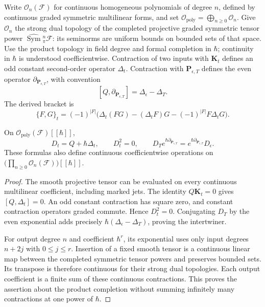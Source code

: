 Write $\mathcal O_n(\mathcal F)$ for continuous homogeneous
polynomials of degree $n$, defined by continuous graded symmetric
multilinear forms, and set
$\mathcal O_{\mathrm{poly}}=\bigoplus_{n\geq0}\mathcal O_n$.
Give $\mathcal O_n$ the strong dual topology of the completed
projective graded symmetric tensor power
$\widehat{\operatorname{Sym}}{}^n_\pi\mathcal F$:
its seminorms are uniform bounds on bounded sets of that space.
Use the product topology in field degree and formal completion
in $\hbar$; continuity in $\hbar$ is understood coefficientwise.
Contraction of two inputs with $\mathbf K_t$ defines an odd
constant second-order operator $\Delta_t$.
Contraction with $\mathbf P_{\epsilon,T}$ defines the even
operator $\partial_{\mathbf P_{\epsilon,T}}$, with convention
\[
 [Q,\partial_{\mathbf P_{\epsilon,T}}]
      =\Delta_\epsilon-\Delta_T.
\]
The derived bracket is
\[
 \{F,G\}_t=(-1)^{|F|}
  \bigl(\Delta_t(FG)-(\Delta_tF)G
                   -(-1)^{|F|}F\Delta_tG\bigr).
\]

\begin{proposition}\label{mht:prop:free-heat-bv}
On $\mathcal O_{\mathrm{poly}}(\mathcal F)[[\hbar]]$,
\begin{equation}\label{mht:eq:free-heat-flow}
 D_t=Q+\hbar\Delta_t,\qquad D_t^2=0,
 \qquad
 D_Te^{\hbar\partial_{\mathbf P_{\epsilon,T}}}
   =e^{\hbar\partial_{\mathbf P_{\epsilon,T}}}D_\epsilon.
\end{equation}
These formulas also define continuous coefficientwise operations
on $\bigl(\prod_{n\geq0}\mathcal O_n(\mathcal F)\bigr)[[\hbar]]$.
\end{proposition}

\begin{proof}
The smooth projective tensor can be evaluated on every
continuous multilinear coefficient, including marked jets.
The identity $Q\mathbf K_t=0$ gives $[Q,\Delta_t]=0$.
An odd constant contraction has square zero, and constant
contraction operators graded commute. Hence $D_t^2=0$.
Conjugating $D_T$ by the even exponential adds precisely
$\hbar(\Delta_\epsilon-\Delta_T)$, proving the intertwiner.

For output degree $n$ and coefficient $\hbar^r$, its
exponential uses only input degrees $n+2j$ with $0\leq j\leq r$.
Insertion of a fixed smooth tensor is a continuous linear map
between the completed symmetric tensor powers and preserves
bounded sets. Its transpose is therefore continuous for their
strong dual topologies. Each output coefficient is a finite sum
of these continuous contractions. This proves the assertion
about the product completion without summing infinitely many
contractions at one power of $\hbar$.
\end{proof}

